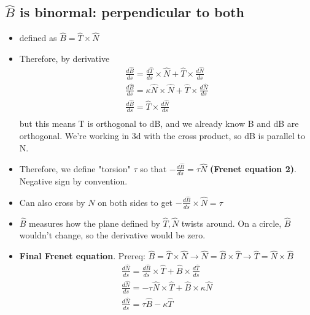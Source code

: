 \documentclass[11pt, oneside]{article}   	%
\begin{document}
\subsection{$\hat{B}$ is binormal: perpendicular to both}
\begin{itemize}
\item defined as $\hat{B} = \hat{T} \times \hat{N}$
\item Therefore, by derivative 
\begin{align}
\frac{d\hat{B}}{ds} = \frac{d\hat{T}}{ds} \times \hat{N} +  \hat{T} \times \frac{d\hat{N}}{ds}\\ 
\frac{d\hat{B}}{ds} = \kappa \hat{N} \times \hat{N}  +  \hat{T} \times \frac{d\hat{N}}{ds}\\ 
\frac{d\hat{B}}{ds} =  \hat{T} \times \frac{d\hat{N}}{ds}\\ 
\end{align}
but this means T is orthogonal to dB, and we already know B and dB are orthogonal.
We're working in 3d with the cross product, so dB is parallel to N.
\item Therefore, we define "torsion" $\tau$ so that $- \frac{d\hat{B}}{ds}  = \tau \hat{N}$  \textbf{(Frenet equation 2)}.  Negative sign by convention.
\item Can also cross by $N$ on both sides to get $- \frac{d\hat{B}}{ds}  \times \hat{N} = \tau $ 
\item $\hat{B}$ measures how the plane defined by $\hat{T}, \hat{N}$ twists around.  On a circle, $\hat{B}$ wouldn't change, so the derivative would be zero.
\item \textbf{Final Frenet equation}.  Prereq: $\hat{B} = \hat{T} \times \hat{N} \rightarrow \hat{N} = \hat{B} \times \hat{T} \rightarrow \hat{T} = \hat{N} \times \hat{B}$
\begin{align}
\frac{d\hat{N}}{ds} = \frac{d\hat{B}}{ds} \times \hat{T} +   \hat{B} \times  \frac{d\hat{T}}{ds} \\
\frac{d\hat{N}}{ds} = -\tau \hat{N} \times \hat{T} + \hat{B} \times \kappa \hat{N} \\ 
\frac{d\hat{N}}{ds}  = \tau \hat{B} - \kappa \hat{T}
\end{align}

\end{itemize}
\end{document}
